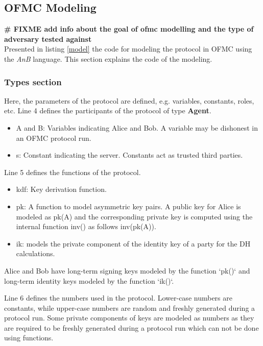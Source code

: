\subsection{OFMC Modeling}
\textbf{\LARGE \# FIXME add info about the goal of ofmc modelling and the type of adversary tested against}\\

Presented in listing \ref{model} the code for modeling the protocol in OFMC using the \textit{AnB} language. This section explains the code of the modeling.


\subsubsection{Types section} 
Here, the parameters of the protocol are defined, e.g. variables, constants, roles, etc. Line 4 defines the participants of the protocol of type \textbf{Agent}.
\begin{itemize}\setlength\itemsep{-0.3em}
	\item A and B: Variables indicating Alice and Bob. A variable may be dishonest in an OFMC protocol run.
	\item s: Constant indicating the server. Constants act as trusted third parties.
\end{itemize}
\par
Line 5 defines the functions of the protocol.
\begin{itemize}\setlength\itemsep{-0.3em}
	\item kdf: Key derivation function.
	\item pk: A function to model asymmetric key pairs. A public key for Alice is modeled as pk(A) and the corresponding private key is computed using the internal function inv() as follows inv(pk(A)).
	\item ik: models the private component of the identity key of a party for the DH calculations.
\end{itemize}
	Alice and Bob have long-term signing keys modeled by the function `pk()` and long-term identity keys modeled by the function `ik()`.
	\par
Line 6 defines the numbers used in the protocol. Lower-case numbers are constants, while upper-case numbers are random and freshly generated during a protocol run. Some private components of keys are modeled as numbers as they are required to be freshly generated during a protocol run which can not be done using functions.
